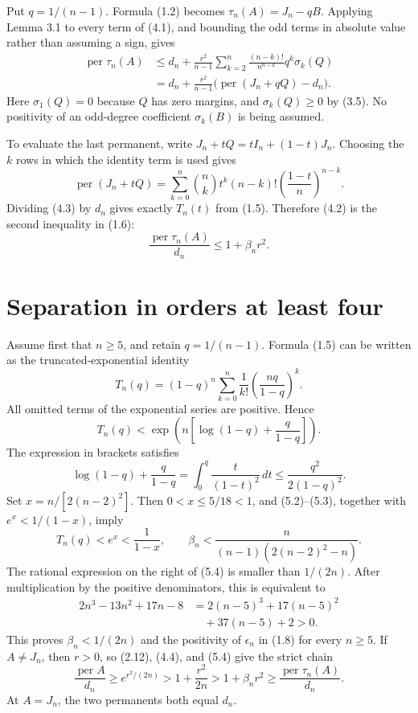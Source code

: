 \documentclass[11pt]{article}
\begin{document}
Put $q=1/(n-1)$. Formula (1.2) becomes
$\tau_n(A)=J_n-qB$. Applying Lemma 3.1 to every term of (4.1), and bounding
the odd terms in absolute value rather than assuming a sign, gives
\[
\begin{aligned}
\operatorname{per}\tau_n(A)
&\le d_n+\frac{r^2}{n-1}
\sum_{k=2}^n\frac{(n-k)!}{n^{n-k}}q^k\sigma_k(Q)\\
&=d_n+\frac{r^2}{n-1}
\bigl(\operatorname{per}(J_n+qQ)-d_n\bigr).
\end{aligned}
\tag{4.2}
\]
Here $\sigma_1(Q)=0$ because $Q$ has zero margins, and
$\sigma_k(Q)\ge0$ by (3.5). No positivity of an odd-degree coefficient
$\sigma_k(B)$ is being assumed.

To evaluate the last permanent, write
$J_n+tQ=tI_n+(1-t)J_n$. Choosing the $k$ rows in which the identity term is
used gives
\[
\operatorname{per}(J_n+tQ)
=\sum_{k=0}^n \binom{n}{k}t^k(n-k)!
\left(\frac{1-t}{n}\right)^{n-k}.
\tag{4.3}
\]
Dividing (4.3) by $d_n$ gives exactly $T_n(t)$ from (1.5). Therefore (4.2)
is the second inequality in (1.6):
\[
\frac{\operatorname{per}\tau_n(A)}{d_n}\le1+\beta_nr^2.
\tag{4.4}
\]
\section{Separation in orders at least four}

Assume first that $n\ge5$, and retain $q=1/(n-1)$. Formula (1.5) can be
written as the truncated-exponential identity
\[
T_n(q)=(1-q)^n
\sum_{k=0}^n\frac1{k!}
\left(\frac{nq}{1-q}\right)^k.
\tag{5.1}
\]
All omitted terms of the exponential series are positive. Hence
\[
T_n(q)<
\exp\!\left(n\left[\log(1-q)+\frac{q}{1-q}\right]\right).
\tag{5.2}
\]
The expression in brackets satisfies
\[
\log(1-q)+\frac{q}{1-q}
=\int_0^q\frac{t}{(1-t)^2}\,dt
\le\frac{q^2}{2(1-q)^2}.
\tag{5.3}
\]
Set $x=n/[2(n-2)^2]$. Then $0<x\le5/18<1$, and (5.2)--(5.3), together
with $e^x<1/(1-x)$, imply
\[
T_n(q)<e^x<\frac1{1-x},
\qquad
\beta_n<
\frac{n}{(n-1)(2(n-2)^2-n)}.
\tag{5.4}
\]
The rational expression on the right of (5.4) is smaller than $1/(2n)$.
After multiplication by the positive denominators, this is equivalent to
\[
\begin{aligned}
2n^3-13n^2+17n-8
&=2(n-5)^3+17(n-5)^2\\
&\quad+37(n-5)+2>0.
\end{aligned}
\tag{5.5}
\]
This proves $\beta_n<1/(2n)$ and the positivity of $\epsilon_n$ in (1.8)
for every $n\ge5$. If $A\ne J_n$, then $r>0$, so (2.12), (4.4), and (5.4)
give the strict chain
\[
\frac{\operatorname{per}A}{d_n}
\ge e^{r^2/(2n)}
>1+\frac{r^2}{2n}
>1+\beta_nr^2
\ge\frac{\operatorname{per}\tau_n(A)}{d_n}.
\tag{5.6}
\]
At $A=J_n$, the two permanents both equal $d_n$.
\end{document}
